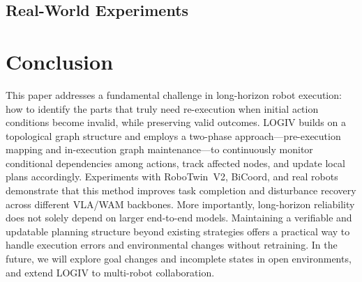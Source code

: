 \documentclass[letterpaper,10pt,conference]{ieeeconf}
\newcommand{\method}{LOGIV\xspace}
\begin{document}
\subsection{Real-World Experiments}


\section{Conclusion}
This paper addresses a fundamental challenge in long-horizon robot execution: how to identify the parts that truly need re-execution when initial action conditions become invalid, while preserving valid outcomes. \method builds on a topological graph structure and employs a two-phase approach—pre-execution mapping and in-execution graph maintenance—to continuously monitor conditional dependencies among actions, track affected nodes, and update local plans accordingly. Experiments with RoboTwin~V2, BiCoord, and real robots demonstrate that this method improves task completion and disturbance recovery across different VLA/WAM backbones. More importantly, long-horizon reliability does not solely depend on larger end-to-end models. Maintaining a verifiable and updatable planning structure beyond existing strategies offers a practical way to handle execution errors and environmental changes without retraining. In the future, we will explore goal changes and incomplete states in open environments, and extend \method to multi-robot collaboration.

\FloatBarrier
\balance


\end{document}

